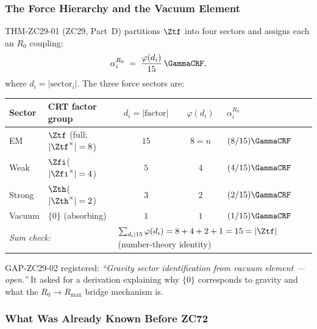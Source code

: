 \documentclass[12pt, a4paper]{article}
\begin{document}
\subsubsection{The Force Hierarchy and the Vacuum Element}

THM-ZC29-01 (ZC29, Part~D) partitions $\Ztf$ into four sectors
and assigns each an $R_0$ coupling:
\[
  \alpha_i^{R_0}
  \;=\;
  \frac{\varphi(d_i)}{15}\,\GammaCRF,
\]
where $d_i = |\text{sector}_i|$.
The three force sectors are:
\begin{center}
{\footnotesize\renewcommand{\arraystretch}{1.30}
\begin{tabular}{@{}p{1.5cm}p{3.2cm}cc>{\raggedright\arraybackslash}p{1.9cm}@{}}
\toprule
Sector & CRT factor group
  & $d_i = |\text{factor}|$
  & $\varphi(d_i)$
  & $\alpha_i^{R_0}$ \\
\midrule
EM     & $\Ztf$ (full; $|\Ztf^\times|=8$) & $15$ & $8 = n$ & $(8/15)\GammaCRF$ \\
Weak   & $\Zfi$\quad ($|\Zfi^\times|=4$)    & $5$  & $4$     & $(4/15)\GammaCRF$ \\
Strong & $\Zth$\quad ($|\Zth^\times|=2$)    & $3$  & $2$     & $(2/15)\GammaCRF$ \\
Vacuum & $\{0\}$ (absorbing)               & $1$  & $1$     & $(1/15)\GammaCRF$ \\
\midrule
\multicolumn{2}{l}{\textit{Sum check:}} & 
  \multicolumn{3}{l}{\footnotesize$\sum_{d_i | 15}\varphi(d_i) = 8+4+2+1 = 15 = |\Ztf|$
  (number-theory identity)} \\
\bottomrule
\end{tabular}
}
\end{center}

GAP-ZC29-02 registered: \emph{``Gravity sector identification from
vacuum element --- open.''} It asked for a derivation explaining
why $\{0\}$ corresponds to gravity and what the $R_0 \to R_{\max}$
bridge mechanism is.

\subsubsection{What Was Already Known Before ZC72}
\end{document}
